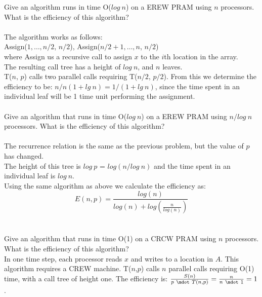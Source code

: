 \documentclass[10pt]{article}
\begin{document}
Give an algorithm runs in time O($log~n$) on a EREW PRAM using $n$ processors. What is the
efficiency of this algorithm?\\
\\
The algorithm works as follows:\\
Assign($1, \ldots, n/2$, $n/2$), Assign($n/2 + 1, \ldots, n$, $n/2$)\\ 
where Assign us a recursive call to assign $x$ to the $i$th location in the array.\\
The resulting call tree has a height of $log~n$, and $n$ leaves.\\
T($n$, $p$) calls two parallel calls requiring T($n/2$, $p/2$). From this we 
determine the efficiency to be: $n/n(1 + lg~n) =  1/(1+ lg~n)$, since the time spent in an 
individual leaf will be 1 time unit performing the assignment.\\ 
\\
Give an algorithm that runs in time O($log~n$) on a EREW PRAM using $n/log~n$ processors. What
is the efficiency of this algorithm?\\
\\
The recurrence relation is the same as the previous problem, but the value of $p$ has changed.\\
The height of this tree is $log~p$ = $log(n/log~n)$ and the time spent in an individual leaf is $log~n$.\\ 
Using the same algorithm as above we calculate the efficiency as:\\
	\[
	E(n,p) = \frac{log(n)}{log(n)+log(\frac{n}{log(n)})}
\]
\\
\\
Give an algorithm that runs in time O(1) on a CRCW PRAM using $n$ processors. What is the
efficiency of this algorithm?\\
In one time step, each processor reads $x$ and writes to a location in $A$. This algorithm requires
a CREW machine. T($n$,$p$) calls $n$ parallel calls requiring O(1) time, with a call tree of height one.
The efficiency is: $\frac{S(n)}{p~\mdot~T(n,p)} = \frac{n}{n~\mdot~1} = 1$.
\\
\end{document}
